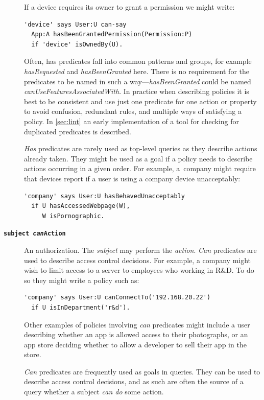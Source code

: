 \documentclass[thesis.tex]{subfiles}
\begin{document}
\begin{description}
  If a device requires its owner to grant a permission we might write:
  \begin{lstlisting}
'device' says User:U can-say
  App:A hasBeenGrantedPermission(Permission:P)
  if 'device' isOwnedBy(U).
  \end{lstlisting}

  Often, has predicates fall into common patterns and groups, for example
  \emph{hasRequested} and \emph{hasBeenGranted} here.  There is no requirement
  for the predicates to be named in such a way---\emph{hasBeenGranted} could be
  named \emph{canUseFeaturesAssociatedWith}.  In practice when describing
  policies it is best to be consistent and use just one predicate for one action
  or property to avoid confusion, redundant rules, and multiple ways of
  satisfying a policy.  In \autoref{sec:lint} an early implementation of a tool
  for checking for duplicated predicates is described.

  \emph{Has} predicates are rarely used as top-level queries as they
  describe actions already taken.  They might be used as a goal if a
  policy needs to describe actions occurring in a given order.  For
  example, a~company might require that devices report if a user is
  using a company device unacceptably:

  \begin{lstlisting}
'company' says User:U hasBehavedUnacceptably
  if U hasAccessedWebpage(W),
     W isPornographic.
  \end{lstlisting}

\item[\bfseries\texttt{subject \emph{can}Action}]
  An authorization.
  The \emph{subject} may perform the \emph{action}.
  \emph{Can} predicates are used to describe access control decisions.
  For example, a company might wish to limit access to a server to
  employees who working in R\&D.  To do so they might write a policy
  such as:
  \begin{lstlisting}
'company' says User:U canConnectTo('192.168.20.22')
  if U isInDepartment('r&d').
  \end{lstlisting}
  Other examples of policies involving \emph{can} predicates might include a
  user describing whether an app is allowed access to their photographs,
  or an app store deciding whether to allow a developer to sell their
  app in the store.

  \emph{Can} predicates are frequently used as goals in queries.  They can be
  used to describe access control decisions, and as such are often the source of
  a query whether a subject \emph{can do} some action. 


\end{description}
\end{document}
